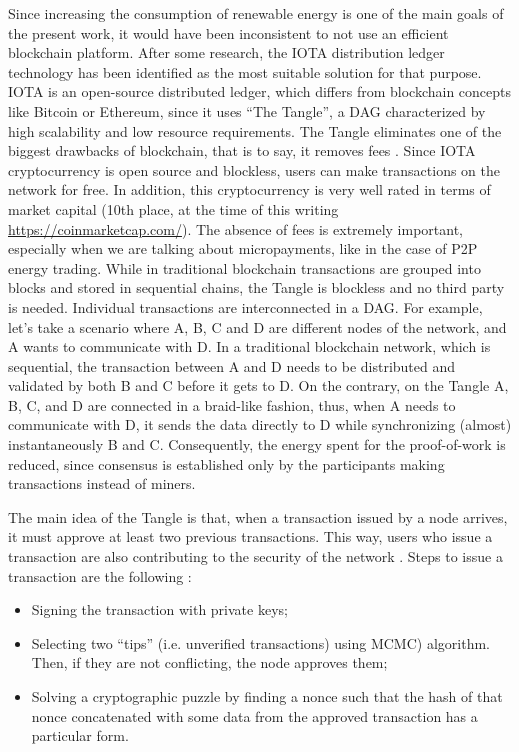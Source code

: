 Since increasing the consumption of renewable energy is one of the main goals of the present work, it would have been inconsistent to not use an efficient blockchain platform. After some research, the IOTA distribution ledger technology has been identified as the most suitable solution for that purpose. IOTA is an open-source distributed ledger, which differs from blockchain concepts like Bitcoin or Ethereum, since it uses “The Tangle”, a \ac{DAG} characterized by high scalability and low resource requirements. The Tangle eliminates one of the biggest drawbacks of blockchain, that is to say, it removes fees \cite{WhatisIOTA}. Since IOTA cryptocurrency is open source and blockless, users can make transactions on the network for free. In addition, this cryptocurrency is very well rated in terms of market capital (10th place, at the time of this writing \url{https://coinmarketcap.com/}).  The absence of fees is extremely important, especially when we are talking about micropayments, like in the case of \ac{P2P} energy trading. While in traditional blockchain transactions are grouped into blocks and stored in sequential chains, the Tangle is blockless and no third party is needed. Individual transactions are interconnected in a \ac{DAG}. For example, let’s take a scenario where A, B, C and D are different nodes of the network, and A wants to communicate with D. In a traditional blockchain network, which is sequential, the transaction between A and D needs to be distributed and validated by both B and C before it gets to D. On the contrary, on the Tangle A, B, C, and D are connected in a braid-like fashion, thus, when A needs to communicate with D, it sends the data directly to D while synchronizing (almost) instantaneously B and C. Consequently, the energy spent for the proof-of-work is reduced, since consensus is established only by the participants making transactions instead of miners.


The main idea of the Tangle is that, when a transaction issued by a node arrives, it must approve at least two previous transactions. This way, users who issue a transaction are also contributing to the security of the network \cite{TheTangle}. Steps to issue a transaction are the following \cite{TheTangle}:

\begin{itemize}
    \item Signing the transaction with private keys;
    \item Selecting two “tips” (i.e. unverified transactions) using \ac{MCMC}) algorithm. Then, if they are not conflicting, the node approves them;
    \item Solving a cryptographic puzzle by finding a nonce such that the hash of that nonce concatenated with some data from the approved transaction has a particular form.
\end{itemize}

